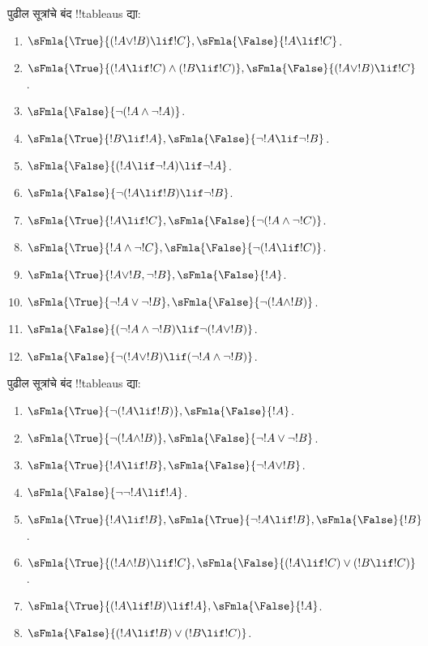 \documentclass[../../../include/open-logic-section]{subfiles}
\begin{document}
\begin{prob}
पुढील सूत्रांचे बंद !!{tableau}s द्या:
\begin{enumerate}
\item $\sFmla{\True}{(!A \lor !B) \lif !C}, \sFmla{\False}{!A \lif !C}$.
\item $\sFmla{\True}{(!A \lif !C) \land (!B \lif !C)}, \sFmla{\False}{(!A \lor !B) \lif !C}$.
\item $\sFmla{\False}{\lnot(!A \land \lnot !A)}$.
\item $\sFmla{\True}{!B \lif !A}, \sFmla{\False}{\lnot !A \lif \lnot !B}$.
\item $\sFmla{\False}{(!A \lif \lnot !A) \lif \lnot !A}$.
\item $\sFmla{\False}{\lnot(!A \lif !B) \lif \lnot !B}$.
\item $\sFmla{\True}{!A \lif !C}, \sFmla{\False}{\lnot (!A \land \lnot !C)}$.
\item $\sFmla{\True}{!A \land \lnot !C}, \sFmla{\False}{\lnot (!A \lif !C)}$.
\item $\sFmla{\True}{!A \lor !B, \lnot !B}, \sFmla{\False}{!A}$.
\item $\sFmla{\True}{\lnot !A \lor \lnot !B}, \sFmla{\False}{\lnot(!A \land !B)}$.
\item $\sFmla{\False}{(\lnot !A \land \lnot !B) \lif\lnot(!A \lor !B)}$.
\item $\sFmla{\False}{\lnot(!A \lor !B) \lif (\lnot !A \land \lnot !B)}$.
\end{enumerate}
\end{prob}

\begin{prob}
पुढील सूत्रांचे बंद !!{tableau}s द्या:
\begin{enumerate}
\item $\sFmla{\True}{\lnot(!A \lif !B)}, \sFmla{\False}{!A}$.
\item $\sFmla{\True}{\lnot(!A \land !B)}, \sFmla{\False}{\lnot !A \lor \lnot !B}$.
\item $\sFmla{\True}{!A \lif !B}, \sFmla{\False}{\lnot !A \lor !B}$.
\item $\sFmla{\False}{\lnot \lnot !A \lif !A}$.
\item $\sFmla{\True}{!A \lif !B}, \sFmla{\True}{\lnot !A \lif !B}, \sFmla{\False}{!B}$.
\item $\sFmla{\True}{(!A \land !B) \lif !C}, \sFmla{\False}{(!A \lif !C) \lor (!B \lif !C)}$.
\item $\sFmla{\True}{(!A \lif !B) \lif !A}, \sFmla{\False}{!A}$.
\item $\sFmla{\False}{(!A \lif !B) \lor (!B \lif !C)}$.
\end{enumerate}
\end{prob}
\end{document}

